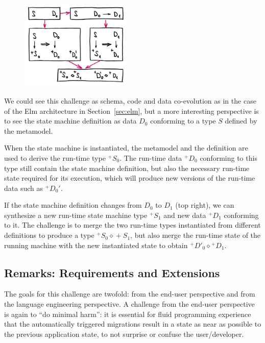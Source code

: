 \documentclass[english,crc]{programming}
\DeclareRobustCommand{\frameworkbox}[1]{\leftbar#1\endleftbar}
\newcommand{\frameworkboxtitle}[1]{\noindent{\firamedium #1.}\quad}
\begin{document}
\frameworkbox{
\begin{figure}
\vspace{-0.75em}
\includegraphics[width=14.5em]{figures/arr-model.png}
\vspace{-1.5em}
\end{figure}
\frameworkboxtitle{Code as Data Migrations}
We could see this challenge as schema, code and data co-evolution as in the case of the Elm
architecture in Section~\ref{sec:elm}, but a more interesting perspective is to see the
state machine definition as data $D_0$ conforming to a type $S$ defined by the metamodel.

When the state machine is instantiated, the metamodel and the definition are used to derive
the run-time type ${}^+\!S_0$. The run-time data ${}^+\!D_0$ conforming to this type still
contain the state machine definition, but also the necessary run-time state required for
its execution, which will produce new versions of the run-time data such as ${}^+\!D_0'$.

If the state machine definition changes from $D_0$ to $D_1$ (top right), we can synthesize
a new run-time state machine type ${}^+\!S_1$ and new data ${}^+\!D_1$ conforming to it.
The challenge is to merge the two run-time types instantiated from different definitions
to produce a type ${}^+\!S_0 \diamond {}+\!S_1$, but also merge the run-time state of the
running machine with the new instantiated state to obtain ${}^+\!D'_0 \diamond {}^+\!D_1$.
}

\subsection*{Remarks: Requirements and Extensions}

The goals for this challenge are twofold: from the end-user perspective and from the language engineering perspective. A challenge from the end-user perspective is again to ``do minimal harm'': it is essential for fluid programming experience that the automatically triggered migrations result in a state as near as possible to the previous application state, to not surprise or confuse the user/developer.
\end{document}
